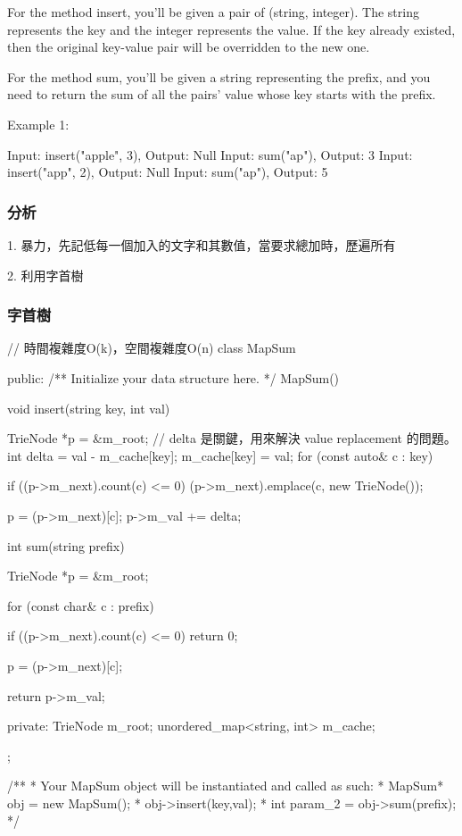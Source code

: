 For the method insert, you'll be given a pair of (string, integer). The string represents the key and the integer represents the value. If the key already existed, then the original key-value pair will be overridden to the new one.

For the method sum, you'll be given a string representing the prefix, and you need to return the sum of all the pairs' value whose key starts with the prefix.

Example 1:
\begin{Code}
Input: insert("apple", 3), Output: Null
Input: sum("ap"), Output: 3
Input: insert("app", 2), Output: Null
Input: sum("ap"), Output: 5
\end{Code}

\subsubsection{分析}
1. 暴力，先記低每一個加入的文字和其數值，當要求總加時，歷遍所有

2. 利用字首樹


\subsubsection{字首樹}
\begin{Code}
// 時間複雜度O(k)，空間複雜度O(n)
class MapSum {
public:
    /** Initialize your data structure here. */
    MapSum() {

    }

    void insert(string key, int val) {
        TrieNode *p = &m_root;
        // delta 是關鍵，用來解決 value replacement 的問題。
        int delta = val - m_cache[key];
        m_cache[key] = val;
        for (const auto& c : key)
        {
            if ((p->m_next).count(c) <= 0)
                (p->m_next).emplace(c, new TrieNode());

            p = (p->m_next)[c];
            p->m_val += delta;
        }
    }

    int sum(string prefix) {
        TrieNode *p = &m_root;

        for (const char& c : prefix)
        {
            if ((p->m_next).count(c) <= 0)
                return 0;

            p = (p->m_next)[c];
        }

        return p->m_val;
    }
private:
    TrieNode m_root;
    unordered_map<string, int> m_cache;
};

/**
 * Your MapSum object will be instantiated and called as such:
 * MapSum* obj = new MapSum();
 * obj->insert(key,val);
 * int param_2 = obj->sum(prefix);
 */
\end{Code}

